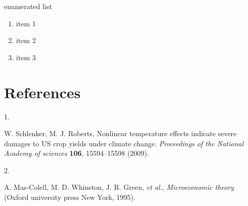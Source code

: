 \documentclass[
]{article}
\providecommand{\tightlist}{%
  \setlength{\itemsep}{0pt}\setlength{\parskip}{0pt}}\usepackage{longtable,booktabs,array}
\newlength{\cslhangindent}
\newlength{\csllabelwidth}
\newenvironment{CSLReferences}[2] %
 {\begin{list}{}{%
  \setlength{\itemindent}{0pt}
  \setlength{\leftmargin}{0pt}
  \setlength{\parsep}{0pt}
  \ifodd #1
   \setlength{\leftmargin}{\cslhangindent}
   \setlength{\itemindent}{-1\cslhangindent}
  \fi
  \setlength{\itemsep}{#2\baselineskip}}}
 {\end{list}}
\newcommand{\CSLLeftMargin}[1]{\parbox[t]{\csllabelwidth}{\strut#1\strut}}
\newcommand{\CSLRightInline}[1]{\parbox[t]{\linewidth - \csllabelwidth}{\strut#1\strut}}
\begin{document}
enumerated list

\begin{enumerate}
\def\labelenumi{\arabic{enumi}.}
\tightlist
\item
  item 1
\item
  item 2
\item
  item 3
\end{enumerate}

\newpage

\section*{References}\label{references}

\label{refs}
\begin{CSLReferences}{0}{1}
\CSLLeftMargin{1. }%
\CSLRightInline{W. Schlenker, M. J. Roberts, Nonlinear temperature
effects indicate severe damages to US crop yields under climate change.
\emph{Proceedings of the National Academy of sciences} \textbf{106},
15594--15598 (2009).}

\CSLLeftMargin{2. }%
\CSLRightInline{A. Mas-Colell, M. D. Whinston, J. R. Green, \emph{et
al.}, \emph{Microeconomic theory} (Oxford university press New York,
1995).}

\end{CSLReferences}
\end{document}

